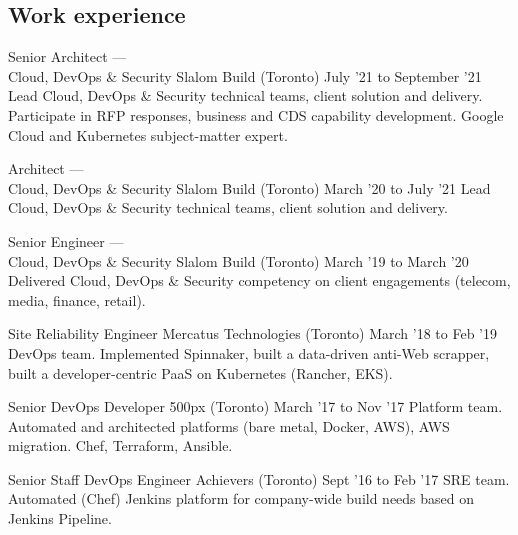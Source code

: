 \documentclass[]{cvpn}
\begin{document}
\cvheader{}

     {\def\gitrev{\unskip}}
     {\def\gitrev{unknown}}
\cvtag{\gitrev}

\begin{multicols}{2}
\section{Work experience}
\begin{eventlist}

\item{Senior Architect ---\\Cloud, DevOps \& Security}
{Slalom Build (Toronto)}
{July '21 to September '21}
{
     Lead Cloud, DevOps \& Security
     technical teams, client solution and delivery.
     Participate in RFP responses, business and CDS capability
     development. Google Cloud and Kubernetes subject-matter
     expert.
}

\eventlink{}

\item{Architect ---\\Cloud, DevOps \& Security}
     {Slalom Build (Toronto)}
     {March '20 to July '21}
{
     Lead Cloud, DevOps \& Security
     technical teams, client solution and delivery.
}

\eventlink{}

\item{Senior Engineer ---\\Cloud, DevOps \& Security}
     {Slalom Build (Toronto)}
     {March '19 to March '20}
{
     Delivered Cloud, DevOps \& Security competency
     on client engagements (telecom, media, finance, retail).
}

\item{Site Reliability Engineer}
     {Mercatus Technologies (Toronto)}
     {March '18 to Feb '19}
{
DevOps team.
Implemented Spinnaker,
built a data-driven anti-Web scrapper,
built a developer-centric PaaS on Kubernetes
(Rancher, EKS).
}

\item{Senior DevOps Developer}
     {500px (Toronto)}
     {March '17 to Nov '17}
{
Platform team.
Automated and architected platforms
(bare metal, Docker, AWS),
AWS migration. Chef, Terraform, Ansible.
}

\item{Senior Staff DevOps Engineer}
     {Achievers (Toronto)}
     {Sept '16 to Feb '17}
{
SRE team.
Automated (Chef) Jenkins platform for company-wide build
needs based on Jenkins Pipeline.
}


\end{eventlist}
\end{multicols}
\end{document}
